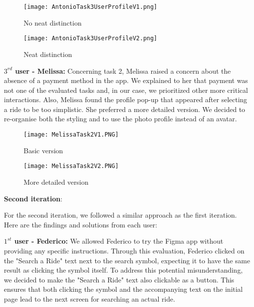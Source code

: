 \documentclass{article}
\begin{document}
\begin{figure}[htbp]
\begin{minipage}[t]{0.25\textwidth}
\texttt{[image: AntonioTask3UserProfileV1.png]}
\caption{No neat distinction}
\end{minipage}
\hfill
\begin{minipage}[t]{0.25\textwidth}
\texttt{[image: AntonioTask3UserProfileV2.png]}
\caption{Neat distinction}
\end{minipage}
\end{figure}
\newpage

\textbf{$3^{rd}$ user - Melissa:} Concerning task 2, Melissa raised a concern about the absence of a payment method in the app. We explained to her that payment was not one of the evaluated tasks and, in our case, we prioritized other more critical interactions. Also, Melissa found the profile pop-up that appeared after selecting a ride to be too simplistic. She preferred a more detailed version. We decided to re-organise both the styling and to use the photo profile instead of an avatar. 

\begin{figure}[htbp]
\begin{minipage}[t]{0.25\textwidth}
\texttt{[image: MelissaTask2V1.PNG]}
\caption{Basic version}
\end{minipage}
\hfill
\begin{minipage}[t]{0.25\textwidth}
\texttt{[image: MelissaTask2V2.PNG]}
\caption{More detailed version}
\end{minipage}
\end{figure}
\newpage

\textbf{Second iteration}: \newline 
\graphicspath{{Doc images/Interactive prototyping/Second iteration}}

 For the second iteration, we followed a similar approach as the first iteration. Here are the findings and solutions from each user: \newline

\textbf{$1^{st}$ user - Federico:} We allowed Federico to try the Figma app without providing any specific instructions. Through this evaluation, Federico clicked on the "Search a Ride" text next to the search symbol, expecting it to have the same result as clicking the symbol itself.  To address this potential misunderstanding, we decided to make the "Search a Ride" text also clickable as a button. This ensures that both clicking the symbol and the accompanying text on the initial page lead to the next screen for searching an actual ride.
\end{document}

